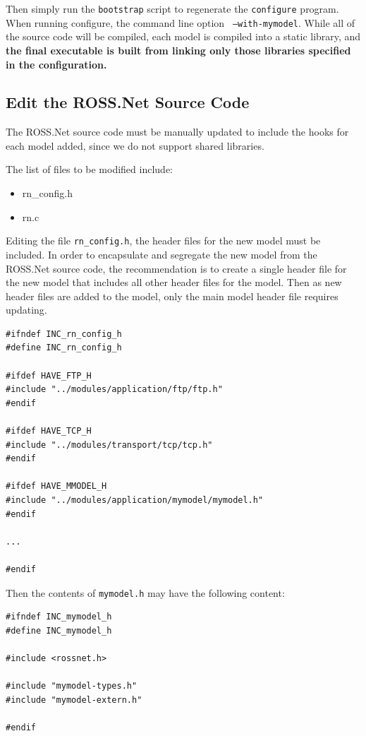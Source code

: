 \documentclass[12pt]{article}
\begin{document}
Then simply run the {\tt bootstrap} script to regenerate the {\tt configure}
 program.  When running configure, the command line option {\tt
 --with-mymodel}. While all of the source code will be compiled, each model is
 compiled into a static library, and {\bf the final executable is built from
 linking only those libraries specified in the configuration.}

\subsection{Edit the ROSS.Net Source Code}

The ROSS.Net source code must be manually updated to include the hooks for
 each model added, since we do not support shared libraries.

The list of files to be modified include:

\begin{itemize}
  \item rn\_config.h
  \item rn.c
\end{itemize}

Editing the file {\tt rn\_config.h}, the header files for the new model must
be included.  In order to encapsulate and segregate the new model from the
ROSS.Net source code, the recommendation is to create a single header file for
the new model that includes all other header files for the model.  Then as new
header files are added to the model, only the main model header file requires
updating.

\begin{small}
\begin{verbatim}
#ifndef INC_rn_config_h
#define INC_rn_config_h

#ifdef HAVE_FTP_H
#include "../modules/application/ftp/ftp.h"
#endif

#ifdef HAVE_TCP_H
#include "../modules/transport/tcp/tcp.h"
#endif

#ifdef HAVE_MMODEL_H
#include "../modules/application/mymodel/mymodel.h"
#endif

...

#endif
\end{verbatim}
\end{small}

Then the contents of {\tt mymodel.h} may have the following content:

\begin{small}
\begin{verbatim}
#ifndef INC_mymodel_h
#define INC_mymodel_h

#include <rossnet.h>

#include "mymodel-types.h"
#include "mymodel-extern.h"

#endif
\end{verbatim}
\end{small}
\end{document}
